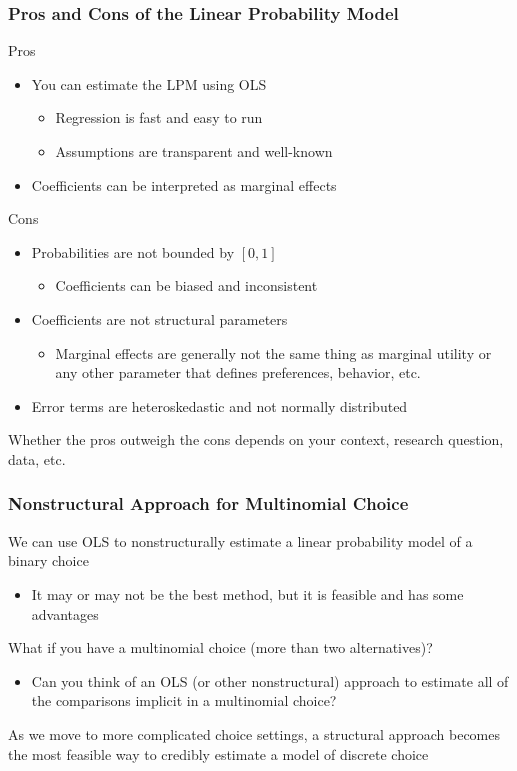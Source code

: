 \documentclass{beamer}\usepackage[]{graphicx}\usepackage[]{xcolor}
\begin{document}
\begin{frame}\frametitle{Pros and Cons of the Linear Probability Model}
    Pros
    \begin{itemize}
    	\item You can estimate the LPM using OLS
    	\begin{itemize}
    		\item Regression is fast and easy to run
    		\item Assumptions are transparent and well-known
    	\end{itemize}
    	\item Coefficients can be interpreted as marginal effects
    \end{itemize}
    \vspace{2ex}
    Cons
    \begin{itemize}
    	\item Probabilities are not bounded by $[0, 1]$
    	\begin{itemize}
    		\item Coefficients can be biased and inconsistent
    	\end{itemize}
    	\item Coefficients are not structural parameters
    	\begin{itemize}
    		\item Marginal effects are generally not the same thing as marginal utility or any other parameter that defines preferences, behavior, etc.
    	\end{itemize}
    	\item Error terms are heteroskedastic and not normally distributed
    \end{itemize}
    \vspace{2ex}
    Whether the pros outweigh the cons depends on your context, research question, data, etc.
\end{frame}

\begin{frame}\frametitle{Nonstructural Approach for Multinomial Choice}
    We can use OLS to nonstructurally estimate a linear probability model of a binary choice
    \begin{itemize}
    	\item It may or may not be the best method, but it is feasible and has some advantages
    \end{itemize}
    \vspace{3ex}
    What if you have a multinomial choice (more than two alternatives)?
    \begin{itemize}
    	\item Can you think of an OLS (or other nonstructural) approach to estimate all of the comparisons implicit in a multinomial choice?
    \end{itemize}
    \vspace{3ex}
    As we move to more complicated choice settings, a structural approach becomes the most feasible way to credibly estimate a model of discrete choice
\end{frame}
\end{document}
